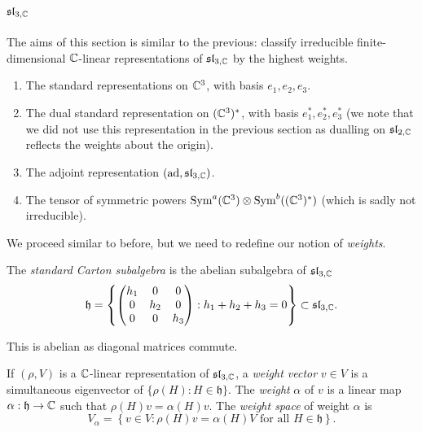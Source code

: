 \section{$\mathfrak{sl}_{3, \mathbb C}$}

The aims of this section is similar to the previous: classify irreducible finite-dimensional $\mathbb C$-linear representations of $\mathfrak{sl}_{3, \mathbb C}$ by the highest weights.

\begin{example}
    \begin{enumerate}
        \item The standard representations on $\mathbb C^3$, with basis $e_1, e_2, e_3$.
        \item The dual standard representation on $(\mathbb C^3)^*$, with basis $e_1^*, e_2^*, e_3^*$ (we note that we did not use this representation in the previous section as dualling on $\mathfrak{sl}_{2, \mathbb C}$ reflects the weights about the origin).
        \item The adjoint representation $(\operatorname{ad}, \mathfrak{sl}_{3, \mathbb C})$.
        \item The tensor of symmetric powers $\operatorname{Sym}^a(\mathbb C^3) \otimes \operatorname{Sym}^b((\mathbb C^3)^*)$ (which is sadly not irreducible).
    \end{enumerate}
\end{example}

We proceed similar to before, but we need to redefine our notion of \emph{weights}.

\begin{definition}
    The \emph{standard Carton subalgebra} is the abelian subalgebra of $\mathfrak{sl}_{3, \mathbb C}$
    \[
        \mathfrak h = \left\{
        \begin{pmatrix}
            h_1 & 0   & 0   \\
            0   & h_2 & 0   \\
            0   & 0   & h_3 \\
        \end{pmatrix}
        : h_1 + h_2 + h_3 = 0
        \right\}
        \subset \mathfrak{sl}_{3, \mathbb C}.
    \]
\end{definition}

This is abelian as diagonal matrices commute.

\begin{definition}
    If $(\rho, V)$ is a $\mathbb C$-linear representation of $\mathfrak{sl}_{3, \mathbb C}$, a \emph{weight vector} $v \in V$ is a simultaneous eigenvector of $\{\rho(H): H \in \mathfrak h\}$. The \emph{weight} $\alpha$ of $v$ is a linear map $\alpha: \mathfrak h \to \mathbb C$ such that $\rho(H)v = \alpha(H)v$. The \emph{weight space} of weight $\alpha$ is
    \[
        V_\alpha = \left\{
        v \in V: \text{$\rho(H) v = \alpha(H)V$ for all $H \in \mathfrak h$}
        \right\}.
    \]
\end{definition}

